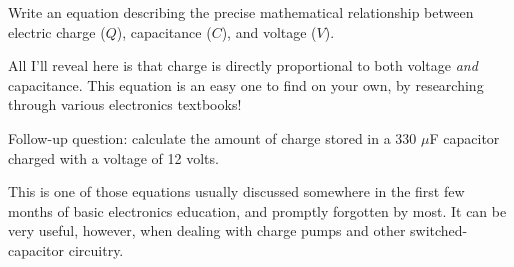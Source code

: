 

Write an equation describing the precise mathematical relationship between electric charge ($Q$), capacitance ($C$), and voltage ($V$).







All I'll reveal here is that charge is directly proportional to both voltage {\it and} capacitance.  This equation is an easy one to find on your own, by researching through various electronics textbooks!

\vskip 10pt

Follow-up question: calculate the amount of charge stored in a 330 $\mu$F capacitor charged with a voltage of 12 volts.







This is one of those equations usually discussed somewhere in the first few months of basic electronics education, and promptly forgotten by most.  It can be very useful, however, when dealing with charge pumps and other switched-capacitor circuitry.




